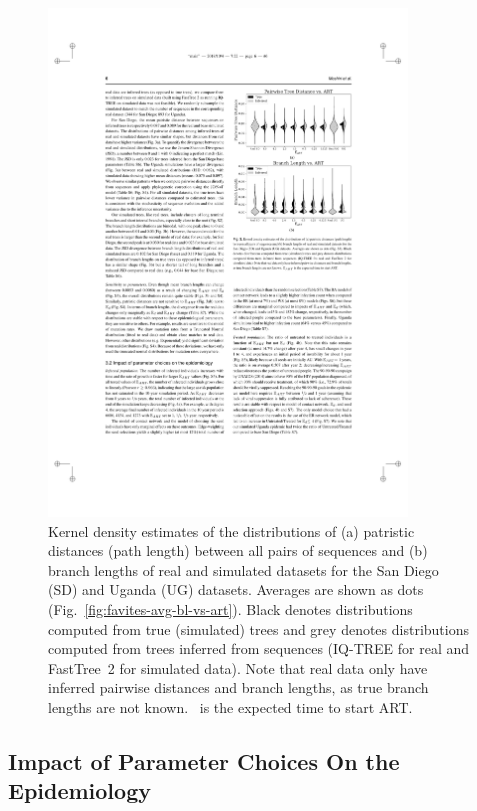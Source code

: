 \begin{figure} %
\centering
\includegraphics[width=0.85\textwidth]{figs/favites-real-vs-sim}
\caption[Real vs. Simulated Data]
{Kernel density estimates of the distributions of (a) patristic distances (path length) between all pairs of sequences and (b) branch lengths of real and simulated datasets for the San Diego (SD) and Uganda (UG) datasets. Averages are shown as dots (Fig.~\ref{fig:favites-avg-bl-vs-art}). Black denotes distributions computed from true (simulated) trees and grey denotes distributions computed from trees inferred from sequences (IQ-TREE for real and FastTree~2 for simulated data).  Note that real data only have inferred pairwise distances and branch lengths, as true branch lengths are not known. \EART\ is the expected time to start ART.}
\label{fig:favites-real-vs-sim}
\end{figure}

\subsection{Impact of Parameter Choices On the Epidemiology}

